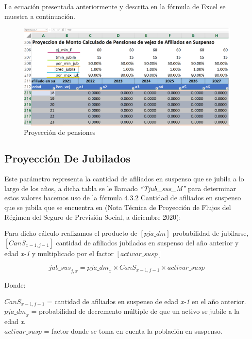 \documentclass[
  letterpaper,
  DIV=11,
  numbers=noendperiod]{scrreprt}
\begin{document}
La ecuación presentada anteriormente y descrita en la fórmula de Excel
se muestra a continuación.

\begin{figure}

{\centering \includegraphics{images/F/Img24.png}

}

\caption{Proyección de pensiones}

\end{figure}

\hypertarget{proyecciuxf3n-de-jubilados}{%
\subsection{Proyección De Jubilados}\label{proyecciuxf3n-de-jubilados}}

Este parámetro representa la cantidad de afiliados en suspenso que se
jubila a lo largo de los años, a dicha tabla se le llamado
\emph{``Tjub\_sus\_M''} para determinar estos valores hacemos uso de la
fórmula 4.3.2 Cantidad de afiliados en suspenso que se jubila que se
encuentra en (Nota Técnica de Proyección de Flujos del Régimen del
Seguro de Previsión Social, a diciembre 2020):

Para dicho cálculo realizamos el producto de \([pja\_dm]\) probabilidad
de jubilarse, \([{CanS}_{x-1,j-1}]\) cantidad de afiliados jubilados en
suspenso del año anterior y edad \emph{x-1} y multiplicado por el factor
\([activar\_susp]\)

\begin{equation}
{jub\_sus}_{j,x}={pja\_dm}_x\times{CanS}_{x-1,j-1}\times activar\_susp
\end{equation}

Donde:

\({CanS}_{x-1,j-1}\) = cantidad de afiliados en suspenso de edad
\emph{x-1} en el año anterior.\\
\(p{ja\_dm}_x\) = probabilidad de decremento múltiple de que un activo
se jubile a la edad \emph{x}.\\
\(activar\_susp\) = factor donde se toma en cuenta la población en
suspenso.
\end{document}
